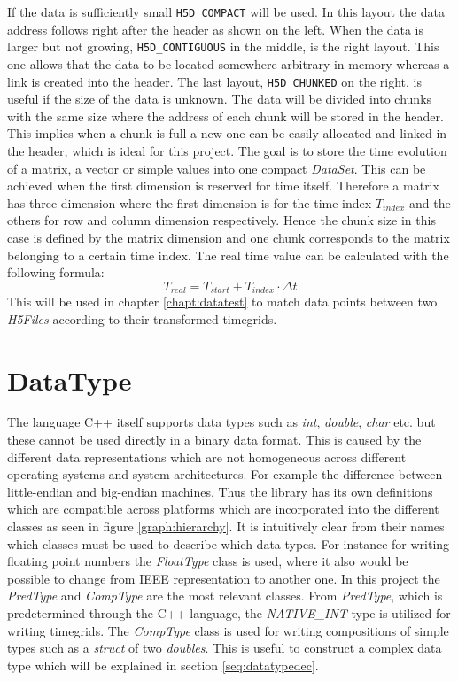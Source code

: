 If the data is sufficiently small \texttt{H5D\_COMPACT} will be used. In this layout the data address follows right after the header as shown on the left. When the data is larger but not growing, \texttt{H5D\_CONTIGUOUS} in the middle, is the right layout. This one allows that the data to be located somewhere arbitrary in memory whereas a link is created into the header. The last layout, \texttt{H5D\_CHUNKED} on the right, is useful if the size of the data is unknown. The data will be divided into chunks with the same size where the address of each chunk will be stored in the header. This implies when a chunk is full a new one can be easily allocated and linked in the header, which is ideal for this project.
The goal is to store the time evolution of a matrix, a vector or simple values into one compact \textit{DataSet}. This can be achieved when the first dimension is reserved for time itself. Therefore a matrix has three dimension where the first dimension is for the time index $T_{index}$ and the others for row and column dimension respectively. Hence the chunk size in this case is defined by the matrix dimension and one chunk corresponds to the matrix belonging to a certain time index. The real time value can be calculated with the following formula:
\begin{equation}
 T_{real} = T_{start} + T_{index} \cdot \Delta t
\end{equation}
This will be used in chapter \ref{chapt:datatest} to match data points between two \textit{H5Files} according to their transformed timegrids.

\section{DataType}
\label{seq:datatype}
The language C++ itself supports data types such as \emph{int}, \emph{double}, \emph{char} etc. but these cannot be used directly in a binary data format.
This is caused by the different data representations which are not homogeneous across different operating systems and system architectures. For example the difference between little-endian and big-endian machines. Thus the library has its own definitions which are compatible across platforms which are incorporated into the different classes as seen in figure \ref{graph:hierarchy}. It is intuitively clear from their names which classes must be used to describe which data types. For instance for writing floating point numbers the \textit{FloatType} class is used, where it also would be possible to change from IEEE representation to another one. In this project the \textit{PredType} and \textit{CompType} are the most relevant classes. From \textit{PredType}, which is predetermined through the C++ language, the \textit{NATIVE\_INT} type is utilized for writing timegrids. The \textit{CompType} class is used for
writing compositions of simple types such as a \textit{struct} of two \textit{doubles}. This is useful to construct a complex data type which will be explained in section \ref{seq:datatypedec}.

